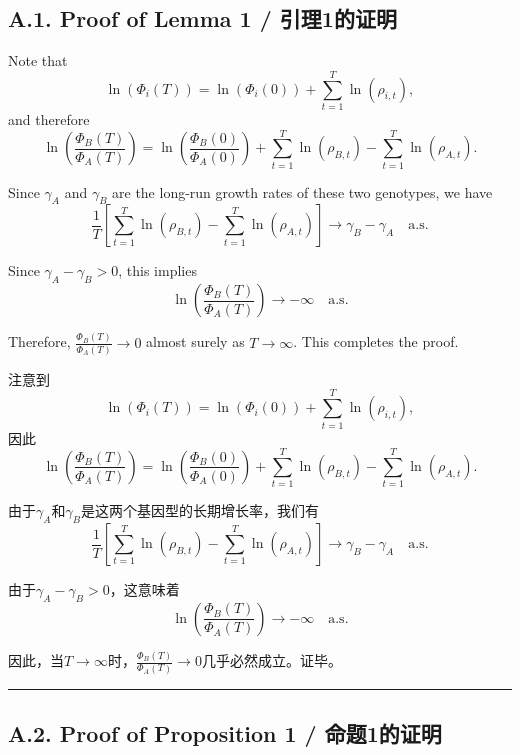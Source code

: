 \documentclass[12pt,a4paper]{article}
\newenvironment{original}
  {\par\noindent\color{black}\smallskip}
  {\par\smallskip}
\newenvironment{translation}
  {\par\noindent\color{blue!70!black}\smallskip}
  {\par\medskip\hrule\medskip}
\begin{document}
\subsection*{A.1. Proof of Lemma 1 / 引理1的证明}

\begin{original}
Note that
\[
\ln(\Phi_i(T)) = \ln(\Phi_i(0)) + \sum_{t=1}^T \ln(\rho_{i,t}),
\]
and therefore
\[
\ln\left( \frac{\Phi_B(T)}{\Phi_A(T)} \right) = \ln\left( \frac{\Phi_B(0)}{\Phi_A(0)} \right) + \sum_{t=1}^T \ln(\rho_{B,t}) - \sum_{t=1}^T \ln(\rho_{A,t}).
\]

Since $\gamma_A$ and $\gamma_B$ are the long-run growth rates of these two genotypes, we have
\[
\frac{1}{T} \left[ \sum_{t=1}^T \ln(\rho_{B,t}) - \sum_{t=1}^T \ln(\rho_{A,t}) \right] \to \gamma_B - \gamma_A \quad \text{a.s.}
\]

Since $\gamma_A - \gamma_B > 0$, this implies
\[
\ln\left( \frac{\Phi_B(T)}{\Phi_A(T)} \right) \to -\infty \quad \text{a.s.}
\]

Therefore, $\frac{\Phi_B(T)}{\Phi_A(T)} \to 0$ almost surely as $T \to \infty$. This completes the proof.
\end{original}
\begin{translation}
注意到
\[
\ln(\Phi_i(T)) = \ln(\Phi_i(0)) + \sum_{t=1}^T \ln(\rho_{i,t}),
\]
因此
\[
\ln\left( \frac{\Phi_B(T)}{\Phi_A(T)} \right) = \ln\left( \frac{\Phi_B(0)}{\Phi_A(0)} \right) + \sum_{t=1}^T \ln(\rho_{B,t}) - \sum_{t=1}^T \ln(\rho_{A,t}).
\]

由于$\gamma_A$和$\gamma_B$是这两个基因型的长期增长率，我们有
\[
\frac{1}{T} \left[ \sum_{t=1}^T \ln(\rho_{B,t}) - \sum_{t=1}^T \ln(\rho_{A,t}) \right] \to \gamma_B - \gamma_A \quad \text{a.s.}
\]

由于$\gamma_A - \gamma_B > 0$，这意味着
\[
\ln\left( \frac{\Phi_B(T)}{\Phi_A(T)} \right) \to -\infty \quad \text{a.s.}
\]

因此，当$T \to \infty$时，$\frac{\Phi_B(T)}{\Phi_A(T)} \to 0$几乎必然成立。证毕。
\end{translation}

\subsection*{A.2. Proof of Proposition 1 / 命题1的证明}
\end{document}
